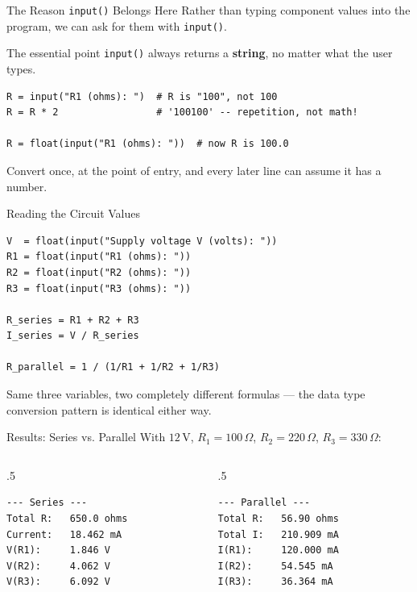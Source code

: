 \documentclass[9pt,aspectratio=169,xcolor=table]{beamer}
\begin{document}
\begin{frame}[fragile]{The Reason \texttt{input()} Belongs Here}
    \leavevmode
    Rather than typing component values into the program, we can ask for
    them with \texttt{input()}.

    \vspace{2mm}
    \begin{alertblock}{The essential point}
        \texttt{input()} \alert{always} returns a \textbf{string}, no
        matter what the user types.
    \end{alertblock}

\begin{lstlisting}
R = input("R1 (ohms): ")  # R is "100", not 100
R = R * 2                 # '100100' -- repetition, not math!

R = float(input("R1 (ohms): "))  # now R is 100.0
\end{lstlisting}

    \vspace{1mm}
    {\small Convert once, at the point of entry, and every later line can
    assume it has a number.}
\end{frame}

\begin{frame}[fragile]{Reading the Circuit Values}
    \leavevmode
\begin{lstlisting}
V  = float(input("Supply voltage V (volts): "))
R1 = float(input("R1 (ohms): "))
R2 = float(input("R2 (ohms): "))
R3 = float(input("R3 (ohms): "))

R_series = R1 + R2 + R3
I_series = V / R_series

R_parallel = 1 / (1/R1 + 1/R2 + 1/R3)
\end{lstlisting}

    \vspace{2mm}
    {\small Same three variables, two completely different formulas ---
    the data type conversion pattern is identical either way.}
\end{frame}

\begin{frame}[fragile]{Results: Series vs. Parallel}
    \leavevmode
    With $12\,\text{V}$, $R_1=100\,\Omega$, $R_2=220\,\Omega$,
    $R_3=330\,\Omega$:

    \begin{columns}[t]
        \begin{column}{.5\textwidth}
\begin{lstlisting}[style=skoutput]
--- Series ---
Total R:   650.0 ohms
Current:   18.462 mA
V(R1):     1.846 V
V(R2):     4.062 V
V(R3):     6.092 V
\end{lstlisting}
        \end{column}
        \begin{column}{.5\textwidth}
\begin{lstlisting}[style=skoutput]
--- Parallel ---
Total R:   56.90 ohms
Total I:   210.909 mA
I(R1):     120.000 mA
I(R2):     54.545 mA
I(R3):     36.364 mA
\end{lstlisting}
        \end{column}
    \end{columns}
\end{frame}
\end{document}
